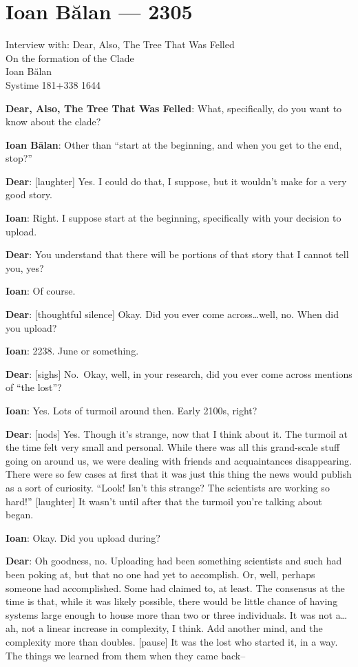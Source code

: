 \hypertarget{ioan-bux103lan-2305}{%
\chapter*{Ioan Bălan — 2305}\label{ioan-bux103lan-2305}}

Interview with: Dear, Also, The Tree That Was Felled\\
On the formation of the Clade\\
Ioan Bălan\\
Systime 181+338 1644

\textbf{Dear, Also, The Tree That Was Felled}: What, specifically, do you want to know about the clade?

\textbf{Ioan Bălan}: Other than ``start at the beginning, and when you get to the end, stop?''

\textbf{Dear}: {[}laughter{]} Yes. I could do that, I suppose, but it wouldn't make for a very good story.

\textbf{Ioan}: Right. I suppose start at the beginning, specifically with your decision to upload.

\textbf{Dear}: You understand that there will be portions of that story that I cannot tell you, yes?

\textbf{Ioan}: Of course.

\textbf{Dear}: {[}thoughtful silence{]} Okay. Did you ever come across\ldots{}well, no. When did you upload?

\textbf{Ioan}: 2238. June or something.

\textbf{Dear}: {[}sighs{]} No.~Okay, well, in your research, did you ever come across mentions of ``the lost''?

\textbf{Ioan}: Yes. Lots of turmoil around then. Early 2100s, right?

\textbf{Dear}: {[}nods{]} Yes. Though it's strange, now that I think about it. The turmoil at the time felt very small and personal. While there was all this grand-scale stuff going on around us, we were dealing with friends and acquaintances disappearing. There were so few cases at first that it was just this thing the news would publish as a sort of curiosity. ``Look! Isn't this strange? The scientists are working so hard!'' {[}laughter{]} It wasn't until after that the turmoil you're talking about began.

\textbf{Ioan}: Okay. Did you upload during?

\textbf{Dear}: Oh goodness, no. Uploading had been something scientists and such had been poking at, but that no one had yet to accomplish. Or, well, perhaps someone had accomplished. Some had claimed to, at least. The consensus at the time is that, while it was likely possible, there would be little chance of having systems large enough to house more than two or three individuals. It was not a\ldots{}ah, not a linear increase in complexity, I think. Add another mind, and the complexity more than doubles. {[}pause{]} It was the lost who started it, in a way. The things we learned from them when they came back--

